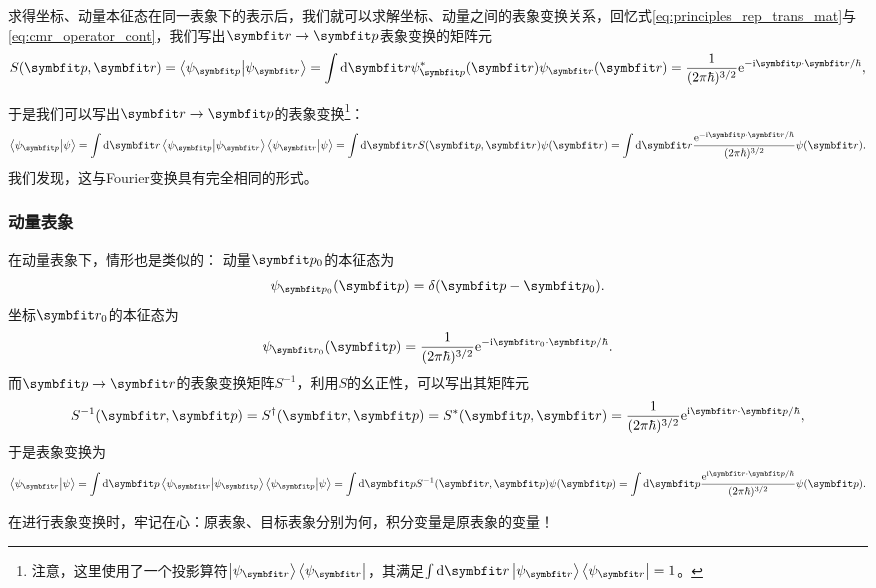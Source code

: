 求得坐标、动量本征态在同一表象下的表示后，我们就可以求解坐标、动量之间的表象变换关系，回忆式\eqref{eq:principles_rep_trans_mat}与\eqref{eq:cmr_operator_cont}，我们写出$\rr\rightarrow\pp$表象变换的矩阵元
\begin{equation}
    S(\pp,\rr) = \braket{\psi_{\pp}}{\psi_{\rr}} = \int\dd\rr \psi_{\pp}^*(\rr) \psi_{\rr}(\rr) = \frac{1}{(2\pi\hbar)^{3/2}} \ee^{-\ii\pp\cdot\rr/\hbar},
\end{equation}
\begin{tcolorbox}
于是我们可以写出$\rr\rightarrow\pp$的表象变换\footnote{注意，这里使用了一个投影算符$\ket{\psi_{\rr}}\bra{\psi_{\rr}}$，其满足$\int\dd\rr\ket{\psi_{\rr}}\bra{\psi_{\rr}}=1$。}：
\begin{equation}
    \braket{\psi_{\pp}}{\psi}
    = \int\dd\rr \braket{\psi_{\pp}}{\psi_{\rr}}\braket{\psi_{\rr}}{\psi}
    = \int\dd\rr S(\pp,\rr)\psi(\rr)
    = \int\dd\rr \frac{\ee^{-\ii\pp\cdot\rr/\hbar}}{(2\pi\hbar)^{3/2}} \psi(\rr).
\end{equation}
我们发现，这与Fourier变换具有完全相同的形式。
\end{tcolorbox}

\subsubsection{动量表象}

在动量表象下，情形也是类似的：
动量$\pp_0$的本征态为
\begin{equation}
    \psi_{\pp_0}(\pp) = \delta(\pp-\pp_0).
\end{equation}
坐标$\rr_0$的本征态为
\begin{equation}
    \psi_{\rr_0}(\pp) = \frac{1}{(2\pi\hbar)^{3/2}} \ee^{-\ii\rr_0\cdot\pp/\hbar}.
\end{equation}
而$\pp\rightarrow\rr$的表象变换矩阵$S^{-1}$，利用$S$的幺正性，可以写出其矩阵元
\begin{equation}
    S^{-1}(\rr,\pp) = S^\dag (\rr,\pp) = S^*(\pp,\rr)
    = \frac{1}{(2\pi\hbar)^{3/2}} \ee^{\ii\rr\cdot\pp/\hbar},
\end{equation}
于是表象变换为
\begin{equation}
    \braket{\psi_{\rr}}{\psi}
    = \int\dd\pp \braket{\psi_{\rr}}{\psi_{\pp}}\braket{\psi_{\pp}}{\psi}
    = \int\dd\pp S^{-1}(\rr,\pp)\psi(\pp)
    = \int\dd\pp \frac{\ee^{\ii\rr\cdot\pp/\hbar}}{(2\pi\hbar)^{3/2}} \psi(\pp).
\end{equation}

在进行表象变换时，牢记在心：原表象、目标表象分别为何，积分变量是原表象的变量！

